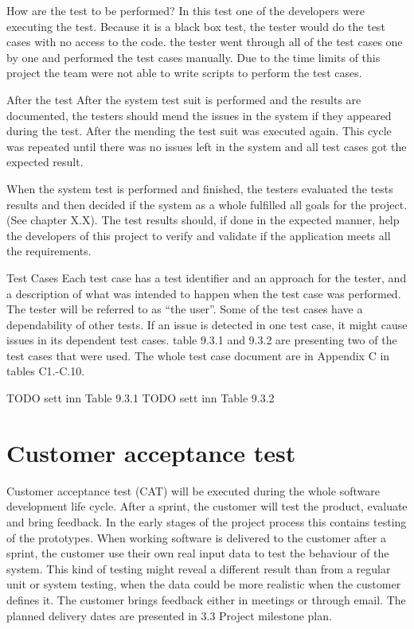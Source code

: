 How are the test to be performed? \newline
In this test one of the developers were executing the test. Because it is a black box test, the tester would do the test cases with no access to the code. the tester went through all of the test cases one by one and performed the test cases manually. Due to the time limits of this project the team were not able to write scripts to perform the test cases. \newline

After the test\newline
After the system test suit is performed and the results are documented, the testers should mend the issues in the system if they appeared during the test. After the mending the test suit was executed again. This cycle was repeated until there was no issues left in the system and all test cases got the expected result.\newline

When the system test is performed and finished, the testers evaluated the tests results and then decided if the system as a whole fulfilled all goals for the project.(See chapter X.X). The test results should, if done in the expected manner, help the developers of this project to verify and validate if the application meets all the requirements.\newline

Test Cases \newline
Each test case has a test identifier and an approach for the tester, and a description of what was intended to happen when the test case was performed. The tester will be referred to as “the user”. Some of the test cases have a dependability of other tests. If an issue is detected in one test case, it might cause issues in its dependent test cases. table 9.3.1 and 9.3.2 are presenting two of the test cases that were used. The whole test case document are in Appendix C in tables C1.-C.10. 

TODO sett inn Table 9.3.1\newline
TODO sett inn Table 9.3.2\newline

\section{Customer acceptance test}

Customer acceptance test (CAT) will be executed during the whole software development life cycle. After a sprint, the customer will test the product, evaluate and bring feedback. In the early stages of the project process this contains testing of the prototypes. When working software is delivered to the customer after a sprint, the customer use their own real input data to test the behaviour of the system. This kind of testing might reveal a different result than from a regular unit or system testing, when the data could be more realistic when the customer defines it. The customer brings feedback either in meetings or through email. The planned delivery dates are presented in 3.3 Project milestone plan.  

